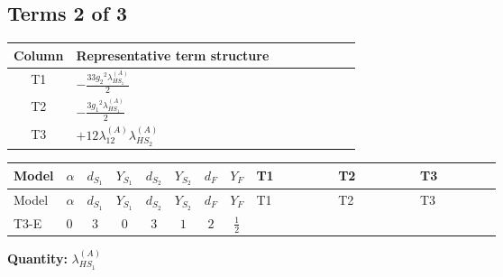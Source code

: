 \documentclass[8pt]{article}
\begin{document}
\begin{landscape}
\subsection*{Terms 2 of 3}
\begin{center}
\begin{tabular}{@{}c >{\raggedright\arraybackslash}p{0.82\linewidth}@{}}
\toprule
Column & Representative term structure \\
\midrule
T1 & \(\displaystyle -\frac{33 {g_2}^2 {\lambda_{HS_1}^{(A)}}}{2}\) \\
\midrule
T2 & \(\displaystyle -\frac{3 {g_1}^2 {\lambda_{HS_1}^{(A)}}}{2}\) \\
\midrule
T3 & \(\displaystyle +12 {\lambda_{12}^{(A)}} {\lambda_{HS_2}^{(A)}}\) \\
\midrule
\bottomrule
\end{tabular}
\end{center}
\smallskip
\tiny
\begin{longtable}{@{}llcccccc >{\raggedright\arraybackslash}p{0.21\linewidth} >{\raggedright\arraybackslash}p{0.21\linewidth} >{\raggedright\arraybackslash}p{0.21\linewidth}@{}}
\toprule
Model & $\alpha$ & $d_{S_1}$ & $Y_{S_1}$ & $d_{S_2}$ & $Y_{S_2}$ & $d_F$ & $Y_F$ & T1 & T2 & T3 \\
\midrule
\endfirsthead
\toprule
Model & $\alpha$ & $d_{S_1}$ & $Y_{S_1}$ & $d_{S_2}$ & $Y_{S_2}$ & $d_F$ & $Y_F$ & T1 & T2 & T3 \\
\midrule
\endhead
T3-E & $0$ & $3$ & $0$ & $3$ & $1$ & $2$ & $\frac{1}{2}$ & \scriptsize\adjustbox{max width=\linewidth}{$\begin{gathered} -\frac{33 {g_2}^2 {\lambda_{HS_1}^{(A)}}}{2}\end{gathered}$} & \scriptsize\adjustbox{max width=\linewidth}{$\begin{gathered} -\frac{3 {g_1}^2 {\lambda_{HS_1}^{(A)}}}{2}\end{gathered}$} & \scriptsize\adjustbox{max width=\linewidth}{$\begin{gathered} +12 {\lambda_{12}^{(A)}} {\lambda_{HS_2}^{(A)}}\end{gathered}$} \\
\midrule
\bottomrule
\end{longtable}
\clearpage
\noindent\textbf{Quantity: }$\lambda_{HS_1}^{(A)}$\par\smallskip

\end{landscape}
\end{document}
